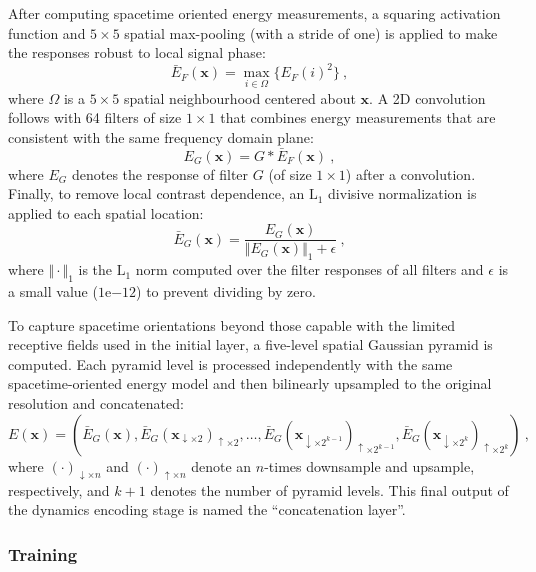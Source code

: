 {After computing spacetime oriented energy measurements, a squaring activation function and $5 \times 5$
spatial max-pooling (with a stride of one) is applied to
make the responses robust to local signal phase:
\begin{equation}
	\bar{E}_F(\mathbf{x}) = \max_{i\in\Omega}\{E_F(i)^2\}\ ,
\end{equation}
where $\Omega$ is a $5 \times 5$ spatial neighbourhood centered about $\mathbf{x}$.
A 2D convolution follows with 64 filters of size $1 \times 1$ that combines
energy measurements that are consistent
with the same frequency domain plane:
\begin{equation}
	E_G(\mathbf{x}) = G * \bar{E}_F(\mathbf{x})\ ,
\end{equation}
where  $E_G$ denotes the response of filter $G$ (of size $1 \times 1$) after a convolution.
Finally, to remove local contrast dependence, an
$\text{L}_1$ divisive normalization is applied to each spatial location:
\begin{equation}
	\bar{E}_G(\mathbf{x}) = \frac{E_G(\mathbf{x})}{\Vert E_G(\mathbf{x}) \Vert_1 + \epsilon}\ ,
\end{equation}
where $\Vert \cdot \Vert_1$ is the $\text{L}_1$ norm computed over the filter responses of all filters and $\epsilon$ is a small value ($1\mathrm{e}{-12}$) to prevent dividing by zero.

To capture spacetime orientations beyond those capable
with the limited receptive fields used in the initial
layer, a five-level spatial Gaussian pyramid is computed.
Each pyramid level is processed independently
with the same spacetime-oriented energy model and then
bilinearly upsampled to the original resolution and
concatenated:
\begin{equation}
	E(\mathbf{x}) = \left( \bar{E}_G(\mathbf{x}) , \bar{E}_G(\mathbf{x}_{\downarrow\times2})_{\uparrow\times2} , \dots , \bar{E}_G(\mathbf{x}_{\downarrow\times2^{k-1}})_{\uparrow\times2^{k-1}} , \bar{E}_G(\mathbf{x}_{\downarrow\times2^k})_{\uparrow\times2^k} \right)\ ,
\end{equation}
where $(\cdot)_{\downarrow \times n}$ and $(\cdot)_{\uparrow \times n}$ denote an $n$-times downsample and upsample, respectively, and $k+1$ denotes the number of pyramid levels. This final output of the dynamics encoding stage is named the ``concatenation layer''.

\subsubsection{Training}

}
